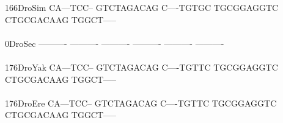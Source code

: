 \documentclass[11pt,twoside,reqno,a4paper]{article}
\begin{document}
{166\hspace*{1\charwidth}DroSim	CA---TCC--	GTCTAGACAG	C----TGTGC	TGCGGAGGTC	CTGCGACAAG	TGGCT-----	\\
\hspace*{4\charwidth}\hspace*{7\charwidth}\hspace*{1\charwidth}\hspace*{1\charwidth}\hspace*{1\charwidth}\hspace*{1\charwidth}\hspace*{1\charwidth}\hspace*{1\charwidth}\\
0\hspace*{3\charwidth}DroSec	----------	----------	----------	----------	----------	----------	\\
\hspace*{4\charwidth}\hspace*{7\charwidth}\hspace*{1\charwidth}\hspace*{1\charwidth}\hspace*{1\charwidth}\hspace*{1\charwidth}\hspace*{1\charwidth}\hspace*{1\charwidth}\\
176\hspace*{1\charwidth}DroYak	CA---TCC--	GTCTAGACAG	C----TGTTC	TGCGGAGGTC	CTGCGACAAG	TGGCT-----	\\
\hspace*{4\charwidth}\hspace*{7\charwidth}\hspace*{1\charwidth}\hspace*{1\charwidth}\hspace*{1\charwidth}\hspace*{1\charwidth}\hspace*{1\charwidth}\hspace*{1\charwidth}\\
176\hspace*{1\charwidth}DroEre	CA---TCC--	GTCTAGACAG	C----TGTTC	TGCGGAGGTC	CTGCGACAAG	TGGCT-----	\\
\hspace*{4\charwidth}\hspace*{7\charwidth}\hspace*{1\charwidth}\hspace*{1\charwidth}\hspace*{1\charwidth}\hspace*{1\charwidth}\hspace*{1\charwidth}\hspace*{1\charwidth}\\
}
\end{document}
